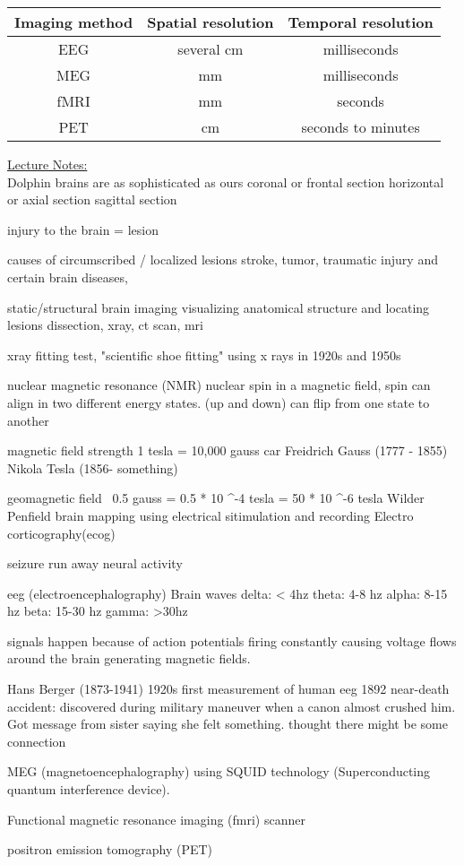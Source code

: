 \documentclass{article}
\begin{document}
\begin{tabular}{||c|c|c||}
    \hline
     \textbf{Imaging method} & \textbf{Spatial resolution} & \textbf{Temporal resolution}  \\ 
     \hline 
     EEG & several cm & milliseconds   \\
     MEG & mm & milliseconds \\
     fMRI & mm & seconds \\
     PET & cm & seconds to minutes \\
     \hline
\end{tabular}

\newpage 
\underline{Lecture Notes:} \\
Dolphin brains are as sophisticated as ours 
coronal or frontal section
horizontal or axial section
sagittal section

injury to the brain = lesion

causes of circumscribed / localized lesions
stroke, tumor, traumatic injury and certain brain diseases, 

static/structural brain imaging
visualizing anatomical structure and locating lesions
dissection, xray, ct scan, mri

xray fitting test, "scientific shoe fitting" using x rays in 1920s and 1950s

nuclear magnetic resonance (NMR) 
nuclear spin
in a magnetic field, spin can align in two different energy states. (up and down)
can flip from one state to another

magnetic field strength 
1 tesla = 10,000 gauss
car Freidrich Gauss (1777 - 1855)
Nikola Tesla (1856- something) 

geomagnetic field ~0.5 gauss
= 0.5 * 10 ^-4 tesla
= 50 * 10 ^-6 tesla 
Wilder Penfield brain mapping using electrical sitimulation and recording
Electro corticography(ecog)

seizure 
run away neural activity

eeg (electroencephalography) Brain waves
delta: < 4hz
theta: 4-8 hz
alpha: 8-15 hz
beta: 15-30 hz
gamma: >30hz

signals happen because of action potentials firing constantly causing voltage flows around the brain generating magnetic fields. 

Hans Berger (1873-1941)
1920s first measurement of human eeg
1892 near-death accident: discovered during military maneuver when a canon almost crushed him. Got message from sister saying she felt something. thought there might be some connection

MEG (magnetoencephalography)
using SQUID technology (Superconducting quantum interference device). 

Functional magnetic resonance imaging (fmri) scanner

positron emission tomography (PET)
\end{document}
